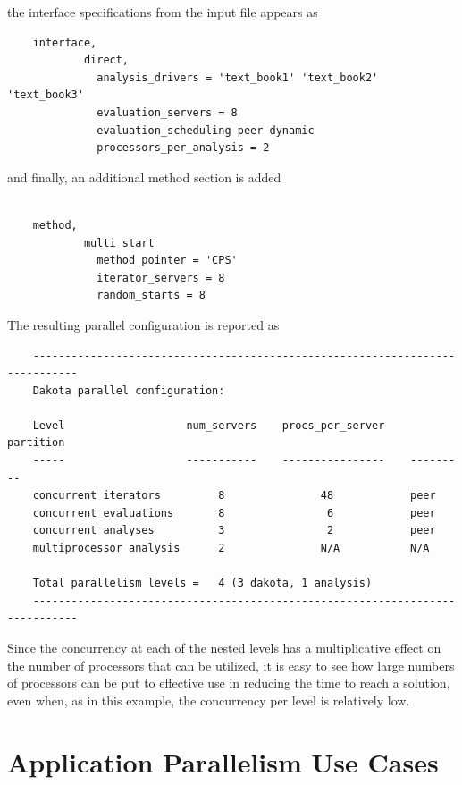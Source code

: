 the interface specifications from the
 input file appears as
\begin{small}
\begin{verbatim}
    interface,
            direct,
              analysis_drivers = 'text_book1' 'text_book2' 'text_book3'
              evaluation_servers = 8
              evaluation_scheduling peer dynamic
              processors_per_analysis = 2
\end{verbatim}
\end{small}

and finally, an additional method section is added
\begin{small}
\begin{verbatim}

    method,
            multi_start
              method_pointer = 'CPS'
              iterator_servers = 8
              random_starts = 8
\end{verbatim}
\end{small}

The resulting parallel configuration is reported as
\begin{small}
\begin{verbatim}
    -----------------------------------------------------------------------------
    Dakota parallel configuration:

    Level                   num_servers    procs_per_server    partition
    -----                   -----------    ----------------    ---------
    concurrent iterators         8               48            peer
    concurrent evaluations       8                6            peer
    concurrent analyses          3                2            peer
    multiprocessor analysis      2               N/A           N/A

    Total parallelism levels =   4 (3 dakota, 1 analysis)
    -----------------------------------------------------------------------------
\end{verbatim}
\end{small}

Since the concurrency at each of the nested levels has a
multiplicative effect on the number of processors that can be
utilized, it is easy to see how large numbers of processors can be put
to effective use in reducing the time to reach a solution, even when,
as in this example, the concurrency per level is relatively low.


\section{Application Parallelism Use Cases}\label{parallel:application}

